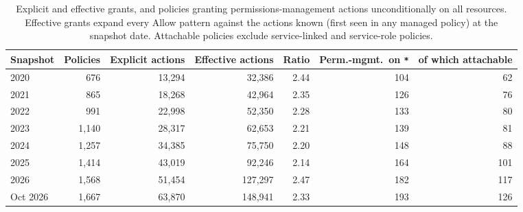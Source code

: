 \begin{table}[t]
\centering
\caption{Explicit and effective grants, and policies granting permissions-management actions unconditionally on all resources. Effective grants expand every Allow pattern against the actions known (first seen in any managed policy) at the snapshot date. Attachable policies exclude service-linked and service-role policies.}
\label{tab:eff}
\footnotesize
\begin{tabular}{lrrrrrr}
\toprule
Snapshot & Policies & Explicit actions & Effective actions & Ratio & Perm.-mgmt.\ on \texttt{*} & of which attachable \\
\midrule
2020 & 676 & 13,294 & 32,386 & 2.44 & 104 & 62 \\
2021 & 865 & 18,268 & 42,964 & 2.35 & 126 & 76 \\
2022 & 991 & 22,998 & 52,350 & 2.28 & 133 & 80 \\
2023 & 1,140 & 28,317 & 62,653 & 2.21 & 139 & 81 \\
2024 & 1,257 & 34,385 & 75,750 & 2.20 & 148 & 88 \\
2025 & 1,414 & 43,019 & 92,246 & 2.14 & 164 & 101 \\
2026 & 1,568 & 51,454 & 127,297 & 2.47 & 182 & 117 \\
Oct 2026 & 1,667 & 63,870 & 148,941 & 2.33 & 193 & 126 \\
\bottomrule
\end{tabular}
\end{table}

